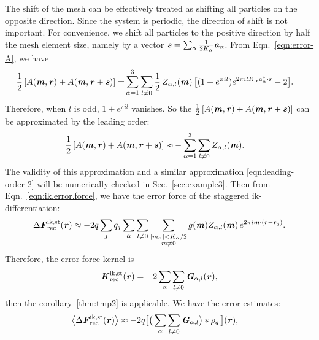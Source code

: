 \documentclass[aps,pre,preprint,unsortedaddress]{revtex4}
\newcommand{\recheck}[1]{{\color{red} #1}}
\renewcommand{\v}[1]{\textbf{\textit{#1}}}
\begin{document}
The shift of the mesh can be effectively treated as shifting all
particles on the opposite direction. Since the system is periodic,
the direction of shift is not important. For convenience, we shift
all particles to the positive direction by half the mesh element size, namely
by a vector $\v s = \sum_\alpha\frac1{2K_\alpha}\v a_\alpha$. From
Eqn.~\eqref{eqn:error-A}, we have
\begin{align}
  \frac12\, [A(\v m, \v r) + A(\v m, \v r+\v s)]
  =&
  \sum_{\alpha=1}^3\sum_{l\neq 0}
  \frac12\,
  Z_{\alpha,l}(\v m)\,
  \big[
  (1 + e^{\pi i l})e^{2\pi i l K_\alpha\v a^\ast_\alpha\cdot \v r} - 2
  \big].
\end{align}
Therefore, when $l$ is odd, $1 + e^{\pi i l}$ vanishes. So the $\frac12\,[A(\v
m, \v r) + A(\v m, \v r+\v s)]$ can be approximated by the leading
order:
\begin{align}\label{eqn:leading-order-1}
  \frac12\, [A(\v m, \v r) + A(\v m, \v r+\v s)]
  \approx&
  -\sum_{\alpha=1}^3\sum_{l\neq 0}
  Z_{\alpha,l}(\v m).
\end{align}
\recheck{The validity of this approximation and a similar approximation
  \eqref{eqn:leading-order-2}
  will be numerically checked in Sec.~\ref{sec:example3}.}
Then from Eqn.~\eqref{eqn:ik.error.force}, we have the error force of
the staggered ik-differentiation:
\begin{align}\label{eqn:ik-st-error-force}
  \Delta\v F^{\textrm{ik,st}}_{\textrm{rec}}(\v r)
  \approx -2q
  \sum_jq_j
  \sum_\alpha\sum_{l\neq 0}
  \sum_{
    \begin{subarray}{c}
      \vert m_{\alpha}\vert < K_\alpha/2\\
      \v m\neq 0
    \end{subarray}}
  g(\v m) Z_{\alpha,l}(\v m)\,e^{2\pi i\v m\cdot(\v r-\v r_j)}.
\end{align}
Therefore, the error force kernel is
\begin{align}
  \v K^{\textrm{ik,st}}_{\textrm{rec}}(\v r)
  = -2
  \sum_\alpha\sum_{l\neq 0}\v G_{\alpha,l}(\v r),
\end{align}
then the corollary~\ref{thm:tmp2} is applicable.
We have the error estimates:
\begin{align}\label{eqn:ik.st.meanf}
  \big\langle
  \Delta\v F_{\textrm{rec}}^{\textrm{ik,st}}(\v r)
  \big\rangle
  & \approx
  - 2 q
  \big[
  \big(
  \sum_{\alpha}\sum_{l\neq 0}\v G_{\alpha,l}
  \big)
  \ast\rho_q\,
  \big] (\v r),
\end{align}
\end{document}
